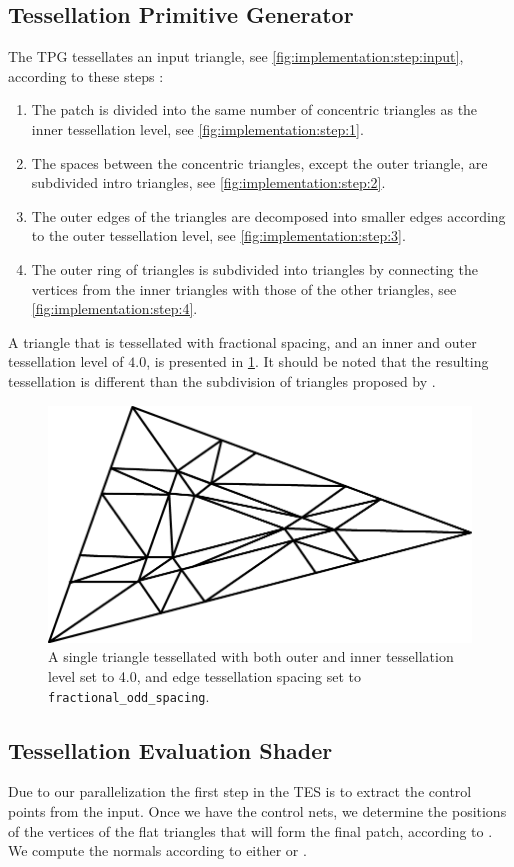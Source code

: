 \subsection{Tessellation Primitive Generator}
\label{ss:implementation:tpg}
	The TPG tessellates an input triangle, see \cref{fig:implementation:step:input}, according to these steps \cite{cozzi2012opengl}:
		\begin{enumerate}[label=(\roman*)]
			\item \label{it:implementation:1} The patch is divided into the same number of concentric triangles as the inner tessellation level, see \cref{fig:implementation:step:1}.
			\item \label{it:implementation:2} The spaces between the concentric triangles, except the outer triangle, are subdivided intro triangles, see \cref{fig:implementation:step:2}.
			\item \label{it:implementation:3} The outer edges of the triangles are decomposed into smaller edges according to the outer tessellation level, see \cref{fig:implementation:step:3}.
			\item \label{it:implementation:4} The outer ring of triangles is subdivided into triangles by connecting the vertices from the inner triangles with those of the other triangles, see \cref{fig:implementation:step:4}.
		\end{enumerate}
	A triangle that is tessellated with fractional spacing, and an inner and outer tessellation level of $4.0$, is presented in \cref{fig:implementation:tessellatedTriangle}. It should be noted that the resulting tessellation is different than the subdivision of triangles proposed by \citeauthor{vlachos2001curved}. 

	\begin{figure}
		\centering
		\includegraphics[width=0.6\columnwidth]{content/img/implementation/tessellatedTriangle.png}
		\caption{A single triangle tessellated with both outer and inner tessellation level set to 4.0, and edge tessellation spacing set to \texttt{fractional\_odd\_spacing}.}
		\label{fig:implementation:tessellatedTriangle}
	\end{figure}

\subsection{Tessellation Evaluation Shader}
\label{ss:implementation:tes}
	Due to our parallelization the first step in the TES is to extract the control points from the input. 
	Once we have the control nets, we determine the positions of the vertices of the flat triangles that will form the final patch, according to . 
	We compute the normals according to either  or .